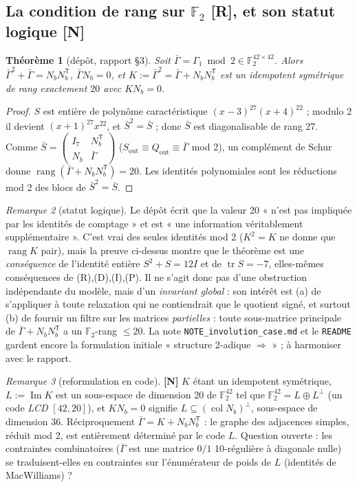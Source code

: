 \documentclass[11pt,a4paper]{article}
\newtheorem{theorem}{Théorème}[section]
\theoremstyle{definition}
\theoremstyle{remark}
\newtheorem{remark}[theorem]{Remarque}
\newcommand{\F}{\mathbb{F}}
\newcommand{\rg}{\operatorname{rang}}
\newcommand{\tr}{\operatorname{tr}}
\newcommand{\Sout}{S_{\mathrm{out}}}
\newcommand{\Qout}{Q_{\mathrm{out}}}
\newcommand{\st}[1]{\textbf{[#1]}}
\newcommand{\code}[1]{\texttt{#1}}
\begin{document}
\subsection{La condition de rang sur $\F_2$ \st{R}, et son statut logique \st{N}}
\begin{theorem}[dépôt, rapport §3]\label{thm:F2}
Soit $\bar\Gamma=\Gamma_1\bmod2\in\F_2^{42\times42}$. Alors $\bar\Gamma^2+\bar\Gamma=N_bN_b^{\mathsf T}$, $\bar\Gamma N_b=0$, et
$K:=\bar\Gamma^2=\bar\Gamma+N_bN_b^{\mathsf T}$ est un idempotent symétrique de rang \emph{exactement} $20$ avec $KN_b=0$.
\end{theorem}
\begin{proof}
$S$ est entière de polynôme caractéristique $(x-3)^{27}(x+4)^{22}$ ; modulo 2 il devient $(x+1)^{27}x^{22}$, et $\bar S^2=\bar S$ ; donc $\bar S$ est diagonalisable de rang 27.
Comme $\bar S=\begin{pmatrix}I_7&N_b^{\mathsf T}\\ N_b&\bar\Gamma\end{pmatrix}$ ($\Sout\equiv\Qout\equiv\bar\Gamma$ mod 2), un complément de Schur donne $\rg(\bar\Gamma+N_bN_b^{\mathsf T})=20$.
Les identités polynomiales sont les réductions mod 2 des blocs de $\bar S^2=\bar S$.
\end{proof}
\begin{remark}[statut logique]\label{rem:statut}
Le dépôt écrit que la valeur 20 « n'est pas impliquée par les identités de comptage » et est « une information véritablement supplémentaire ». C'est vrai des seules identités mod 2 ($K^2=K$ ne donne que $\rg K$ pair), mais la preuve ci-dessus montre que le théorème est une \emph{conséquence} de l'identité entière $S^2+S=12I$ et de $\tr S=-7$, elles-mêmes conséquences de (R),(D),(I),(P). Il ne s'agit donc pas d'une obstruction indépendante du modèle, mais d'un \emph{invariant global} : son intérêt est (a) de s'appliquer à toute relaxation qui ne contiendrait que le quotient signé, et surtout (b) de fournir un filtre sur les matrices \emph{partielles} : toute sous-matrice principale de $\bar\Gamma+N_bN_b^{\mathsf T}$ a un $\F_2$-rang $\le20$. La note \code{NOTE\_involution\_case.md} et le \code{README} gardent encore la formulation initiale « structure 2-adique $\Rightarrow$ » ; à harmoniser avec le rapport.
\end{remark}
\begin{remark}[reformulation en code] \st{N}
$K$ étant un idempotent symétrique, $L:=\operatorname{Im}K$ est un sous-espace de dimension 20 de $\F_2^{42}$ tel que $\F_2^{42}=L\oplus L^\perp$ (un code \emph{LCD} $[42,20]$), et $KN_b=0$ signifie $L\subseteq(\operatorname{col}N_b)^\perp$, sous-espace de dimension 36. Réciproquement $\bar\Gamma=K+N_bN_b^{\mathsf T}$ : le graphe des adjacences simples, réduit mod 2, est entièrement déterminé par le code $L$. Question ouverte : les contraintes combinatoires ($\bar\Gamma$ est une matrice $0/1$ 10-régulière à diagonale nulle) se traduisent-elles en contraintes sur l'énumérateur de poids de $L$ (identités de MacWilliams) ?
\end{remark}
\end{document}

